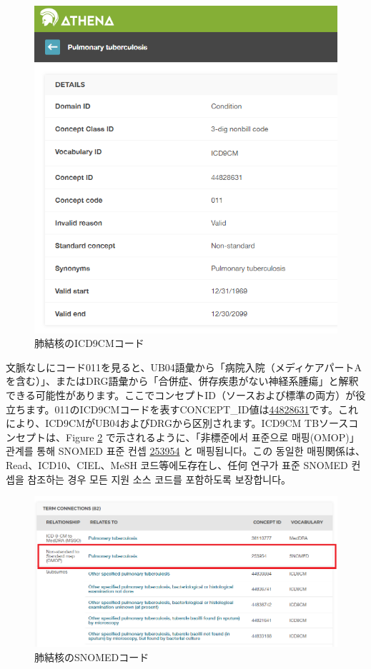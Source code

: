 \documentclass[
  11pt]{book}
\theoremstyle{definition}
\theoremstyle{definition}
\theoremstyle{definition}
\theoremstyle{definition}
\theoremstyle{remark}
\begin{document}
\begin{figure}

{\centering \includegraphics[width=0.75\linewidth]{images/CommonDataModel/pulmTubICD9} 

}

\caption{肺結核のICD9CMコード}\label{fig:pulmTubICD9}
\end{figure}

文脈なしにコード011を見ると、UB04語彙から「病院入院（メディケアパートAを含む）」、またはDRG語彙から「合併症、併存疾患がない神経系腫瘍」と解釈できる可能性があります。ここでコンセプトID（ソースおよび標準の両方）が役立ちます。011のICD9CMコードを表すCONCEPT\_ID値は\href{http://athena.ohdsi.org/search-terms/terms/44828631}{44828631}です。これにより、ICD9CMがUB04およびDRGから区別されます。ICD9CM TBソースコンセプトは、Figure \ref{fig:pulmTubMap} で示されるように、「非標준에서 표준으로 매핑(OMOP)」 관계를 통해 SNOMED 표준 컨셉 \href{http://athena.ohdsi.org/search-terms/terms/253954}{253954} と 매핑됩니다。この 동일한 매핑関係は、Read、ICD10、CIEL、MeSH 코드等에도存在し、任何 연구가 표준 SNOMED 컨셉을 참조하는 경우 모든 지원 소스 코드를 포함하도록 보장합니다。

\begin{figure}
\includegraphics[width=1\linewidth]{images/CommonDataModel/pulmTubMap} \caption{肺結核のSNOMEDコード}\label{fig:pulmTubMap}
\end{figure}
\end{document}
